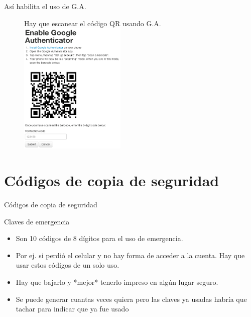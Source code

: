 \documentclass[11pt]{beamer}
\begin{document}
\begin{frame}{As\'i habilita el uso de G.A.}
  \begin{figure}{Hay que escanear el c\'odigo QR usando G.A.}
    \includegraphics[width=2in]{enable-authenticator.png}
  \end{figure}
\end{frame}
\section{C\'odigos de copia de seguridad}
\begin{frame}{C\'odigos de copia de seguridad}
  \begin{block}{Claves de emergencia}
    \begin{itemize}
      \item Son 10 c\'odigos de 8 d\'igitos para el uso de emergencia.
      \item Por ej. si perdi\'o el celular y no hay forma de acceder a la cuenta. Hay que usar estos c\'odigos de un solo uso. 
      \item Hay que bajarlo y *mejor* tenerlo impreso en alg\'un lugar seguro.
      \item Se puede generar cuantas veces quiera pero las claves ya usadas habr\'ia que tachar para indicar que ya fue usado
    \end{itemize}
  \end{block}
\end{frame}
\end{document}
